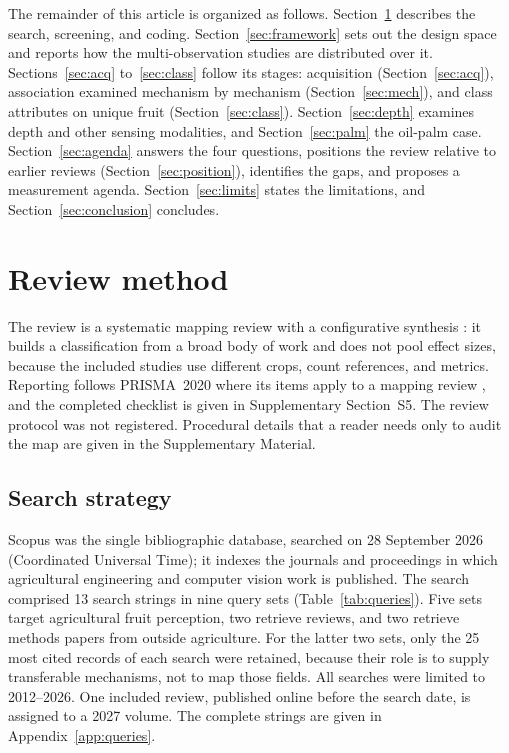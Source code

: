 The remainder of this article is organized as follows. Section~\ref{sec:method} describes the search, screening, and coding. Section~\ref{sec:framework} sets out the design space and reports how the multi-observation studies are distributed over it. Sections~\ref{sec:acq} to~\ref{sec:class} follow its stages: acquisition (Section~\ref{sec:acq}), association examined mechanism by mechanism (Section~\ref{sec:mech}), and class attributes on unique fruit (Section~\ref{sec:class}). Section~\ref{sec:depth} examines depth and other sensing modalities, and Section~\ref{sec:palm} the oil-palm case. Section~\ref{sec:agenda} answers the four questions, positions the review relative to earlier reviews (Section~\ref{sec:position}), identifies the gaps, and proposes a measurement agenda. Section~\ref{sec:limits} states the limitations, and Section~\ref{sec:conclusion} concludes.

\section{Review method}\label{sec:method}

The review is a systematic mapping review with a configurative synthesis \citep{petersen2015mapping,grant2009typology}: it builds a classification from a broad body of work and does not pool effect sizes, because the included studies use different crops, count references, and metrics. Reporting follows PRISMA~2020 where its items apply to a mapping review \citep{page2021prisma,page2021elaboration}, and the completed checklist is given in Supplementary Section~S5. The review protocol was not registered. Procedural details that a reader needs only to audit the map are given in the Supplementary Material.

\subsection{Search strategy}
Scopus was the single bibliographic database, searched on 28 September 2026 (Coordinated Universal Time); it indexes the journals and proceedings in which agricultural engineering and computer vision work is published. The search comprised 13 search strings in nine query sets (Table~\ref{tab:queries}). Five sets target agricultural fruit perception, two retrieve reviews, and two retrieve methods papers from outside agriculture. For the latter two sets, only the 25 most cited records of each search were retained, because their role is to supply transferable mechanisms, not to map those fields. All searches were limited to 2012--2026. One included review, published online before the search date, is assigned to a 2027 volume. The complete strings are given in Appendix~\ref{app:queries}.

